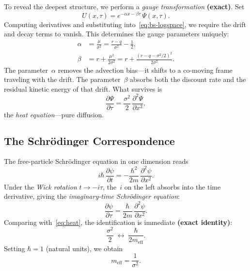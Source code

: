 To reveal the deepest structure, we perform a \emph{gauge transformation} \textbf{(exact)}.  Set
\begin{equation}\label{eq:gauge}
  U(x, \tau) = e^{-\alpha x - \beta \tau}\,\Psi(x, \tau).
\end{equation}
Computing derivatives and substituting into~\eqref{eq:bs-logspace}, we require the drift and decay terms to vanish.  This determines the gauge parameters uniquely:
\begin{align}
  \alpha &= \frac{\mu}{\sigma^2}
         = \frac{r - q}{\sigma^2} - \frac{1}{2}, \label{eq:alpha} \\
  \beta  &= r + \frac{\mu^2}{2\sigma^2}
         = r + \frac{(r - q - \sigma^2/2)^2}{2\sigma^2}. \label{eq:beta}
\end{align}
The parameter~$\alpha$ removes the advection bias---it shifts to a co-moving frame traveling with the drift.  The parameter~$\beta$ absorbs both the discount rate and the residual kinetic energy of that drift.  What survives is
\begin{equation}\label{eq:heat}
  \frac{\partial \Psi}{\partial \tau}
  = \frac{\sigma^2}{2}\,\frac{\partial^2 \Psi}{\partial x^2},
\end{equation}
the \emph{heat equation}---pure diffusion.

\subsection{The Schr\"{o}dinger Correspondence}

The free-particle Schr\"{o}dinger equation in one dimension reads
\begin{equation}\label{eq:schrodinger}
  i\hbar\,\frac{\partial \psi}{\partial t}
  = -\frac{\hbar^2}{2m}\,\frac{\partial^2 \psi}{\partial x^2}.
\end{equation}
Under the \emph{Wick rotation} $t \to -i\tau$, the~$i$ on the left absorbs into the time derivative, giving the \emph{imaginary-time Schr\"{o}dinger equation}:
\begin{equation}\label{eq:imag-time-schrodinger}
  \frac{\partial \psi}{\partial \tau}
  = \frac{\hbar}{2m}\,\frac{\partial^2 \psi}{\partial x^2}.
\end{equation}
Comparing with~\eqref{eq:heat}, the identification is immediate \textbf{(exact identity)}:
\begin{equation}\label{eq:correspondence}
  \frac{\sigma^2}{2} \;\longleftrightarrow\; \frac{\hbar}{2m_{\text{eff}}}.
\end{equation}
Setting $\hbar = 1$ (natural units), we obtain
\begin{equation}\label{eq:effective-mass}
  m_{\text{eff}} = \frac{1}{\sigma^2}.
\end{equation}

